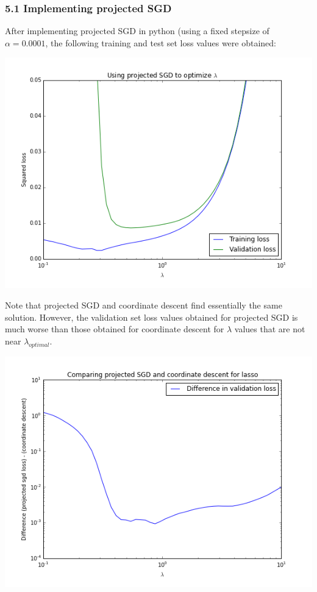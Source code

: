 \documentclass[paper=a4, fontsize=11pt]{scrartcl} %
\numberwithin{equation}{section} %
\numberwithin{figure}{section} %
\numberwithin{table}{section} %
\begin{document}
\subsubsection*{5.1 Implementing projected SGD}

After implementing projected SGD in python (using a fixed stepsize of $\alpha = 0.0001$, the following training and test set loss values were obtained:

\begin{center} \includegraphics[scale=0.65]{./../figures/5_1.png} \end{center}

Note that projected SGD and coordinate descent find essentially the same solution. However, the validation set loss values obtained for projected SGD is much worse than those obtained for coordinate descent for $\lambda$ values that are not near $\lambda_{optimal}$.

\begin{center} \includegraphics[scale=0.65]{./../figures/5_2.png} \end{center}
\end{document}

